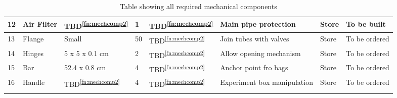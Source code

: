 \begin{longtable}{|m{}|m{}|m{}|m{}|m{}|m{}|m{}|m{}|}
12 & Air Filter & TBD\textsuperscript{\ref{fn:mechcomp2}} & 1 & TBD\textsuperscript{\ref{fn:mechcomp2}} & Main pipe protection & Store & To be built \\ \hline
13 & Flange & Small & 50 & TBD\textsuperscript{\ref{fn:mechcomp2}} & Join tubes with valves & Store & To be ordered \\ \hline
14 & Hinges & 5 x 5 x 0.1 cm & 2 & TBD\textsuperscript{\ref{fn:mechcomp2}} & Allow opening mechanism & Store & To be ordered \\ \hline
15 & Bar & 52.4 x 0.8 cm & 4 & TBD\textsuperscript{\ref{fn:mechcomp2}} & Anchor point fro bags & Store & To be ordered \\ \hline
16 & Handle & TBD\textsuperscript{\ref{fn:mechcomp2}} & 4 & TBD\textsuperscript{\ref{fn:mechcomp2}} & Experiment box manipulation & Store & To be ordered \\ \hline

    \caption{Table showing all required mechanical components}
    \label{tab:mechanical-components}
\end{longtable}
\raggedbottom